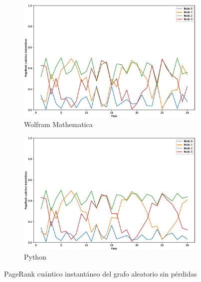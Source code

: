\documentclass[xetex,mathserif,serif]{beamer}
\begin{document}
\begin{frame}
\begin{figure}[H]
    \centering
    \begin{subfigure}[m]{0.45\textwidth}
        \centering
        \includegraphics[width=0.9\linewidth]{img/any-inst-M.eps}
        \caption{Wolfram Mathematica}
    \end{subfigure}
    \begin{subfigure}[m]{0.45\textwidth}
        \centering
        \includegraphics[width=0.9\linewidth]{img/any-inst-lossless.eps}
        \caption{Python}
    \end{subfigure}
    \caption[PageRank cuántico instantáneo del grafo aleatorio sin pérdidas]{PageRank cuántico instantáneo del grafo aleatorio sin pérdidas}
    \label{fig:instanylossless}
\end{figure}


\end{frame}
\end{document}

